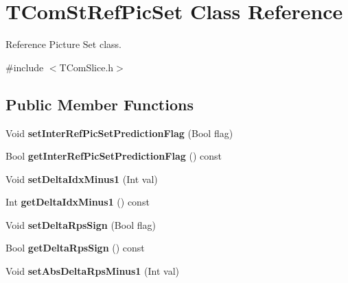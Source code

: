 \hypertarget{class_t_com_st_ref_pic_set}{}\section{T\+Com\+St\+Ref\+Pic\+Set Class Reference}
\label{class_t_com_st_ref_pic_set}


Reference Picture Set class.  




{\ttfamily \#include $<$T\+Com\+Slice.\+h$>$}

\subsection*{Public Member Functions}
\begin{DoxyCompactItemize}
\item 
\mbox{\label{class_t_com_st_ref_pic_set_a0aa43357598b6c453f0dbe202c67326c}} 
Void {\bfseries set\+Inter\+Ref\+Pic\+Set\+Prediction\+Flag} (Bool flag)
\item 
\mbox{\label{class_t_com_st_ref_pic_set_af992f4b5cbcc61dfd043a223544010d1}} 
Bool {\bfseries get\+Inter\+Ref\+Pic\+Set\+Prediction\+Flag} () const
\item 
\mbox{\label{class_t_com_st_ref_pic_set_a8af10ec96fac9b384683a35e14ef397a}} 
Void {\bfseries set\+Delta\+Idx\+Minus1} (Int val)
\item 
\mbox{\label{class_t_com_st_ref_pic_set_a2cbe56ad4478f267a00fe6279130694d}} 
Int {\bfseries get\+Delta\+Idx\+Minus1} () const
\item 
\mbox{\label{class_t_com_st_ref_pic_set_a64b6826221aed787b73eec57c550f67b}} 
Void {\bfseries set\+Delta\+Rps\+Sign} (Bool flag)
\item 
\mbox{\label{class_t_com_st_ref_pic_set_a5769d8fec965c46ec43bb2efb62c0c22}} 
Bool {\bfseries get\+Delta\+Rps\+Sign} () const
\item 
\mbox{\label{class_t_com_st_ref_pic_set_a914c7f9cb6220f98c2a4db179bd6987c}} 
Void {\bfseries set\+Abs\+Delta\+Rps\+Minus1} (Int val)

\end{DoxyCompactItemize}
